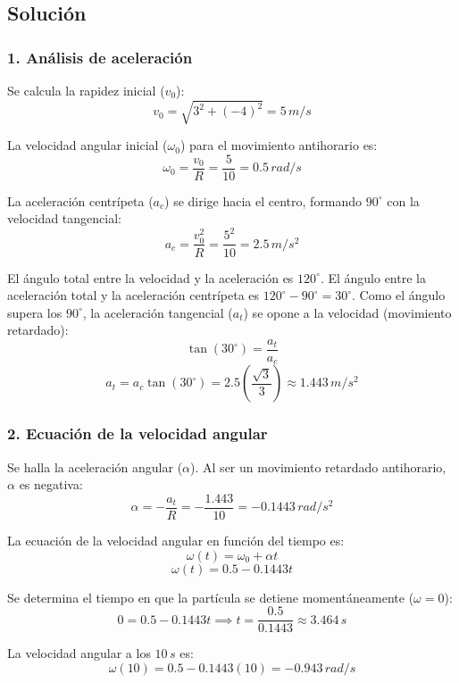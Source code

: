 \documentclass[12pt, a4paper]{article}
\begin{document}
\subsection*{Solución}

\subsubsection*{1. Análisis de aceleración}
Se calcula la rapidez inicial ($v_0$):
$$ v_0 = \sqrt{3^2 + (-4)^2} = 5 \, \si{m/s} $$

La velocidad angular inicial ($\omega_0$) para el movimiento antihorario es:
$$ \omega_0 = \frac{v_0}{R} = \frac{5}{10} = 0.5 \, \si{rad/s} $$

La aceleración centrípeta ($a_c$) se dirige hacia el centro, formando $90^\circ$ con la velocidad tangencial:
$$ a_c = \frac{v_0^2}{R} = \frac{5^2}{10} = 2.5 \, \si{m/s^2} $$

El ángulo total entre la velocidad y la aceleración es $120^\circ$. El ángulo entre la aceleración total y la aceleración centrípeta es $120^\circ - 90^\circ = 30^\circ$.
Como el ángulo supera los $90^\circ$, la aceleración tangencial ($a_t$) se opone a la velocidad (movimiento retardado):
$$ \tan(30^\circ) = \frac{a_t}{a_c} $$
$$ a_t = a_c \tan(30^\circ) = 2.5 \left(\frac{\sqrt{3}}{3}\right) \approx 1.443 \, \si{m/s^2} $$

\subsubsection*{2. Ecuación de la velocidad angular}
Se halla la aceleración angular ($\alpha$). Al ser un movimiento retardado antihorario, $\alpha$ es negativa:
$$ \alpha = -\frac{a_t}{R} = -\frac{1.443}{10} = -0.1443 \, \si{rad/s^2} $$

La ecuación de la velocidad angular en función del tiempo es:
$$ \omega(t) = \omega_0 + \alpha t $$
$$ \omega(t) = 0.5 - 0.1443t $$

Se determina el tiempo en que la partícula se detiene momentáneamente ($\omega = 0$):
$$ 0 = 0.5 - 0.1443t \implies t = \frac{0.5}{0.1443} \approx 3.464 \, \si{s} $$

La velocidad angular a los $10 \, \si{s}$ es:
$$ \omega(10) = 0.5 - 0.1443(10) = -0.943 \, \si{rad/s} $$
\end{document}
